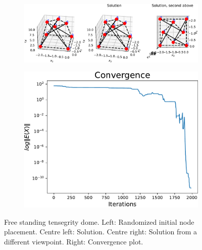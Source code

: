 \begin{figure}[!ht]
\centering
\begin{subfigure}{.72\textwidth}
  \centering
  \includegraphics[width=0.99\linewidth]{Bilder/FREESTANDING.pdf}
\end{subfigure}%
\begin{subfigure}{.3\textwidth}
  \centering
  \includegraphics[width=0.99\linewidth]{Bilder/FREESTANDINGconv.pdf}
\end{subfigure}
\caption{Free standing tensegrity dome. Left: Randomized initial node placement. Centre left: Solution. Centre right: Solution from a different viewpoint. Right: Convergence plot.}
\label{Freestanding}
\end{figure}



